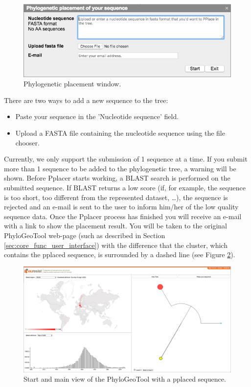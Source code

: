 \documentclass[a4paper, 11pt]{article} %
\begin{document}
\begin{figure}[H]
\centering
\includegraphics[scale=0.50]{images/pplacerWindow.png}
\vspace{-0.25cm}
\caption{Phylogenetic placement window.}
\label{fig:pplacerwindow}
\end{figure}

\noindent There are two ways to add a new sequence to the tree:
\begin{itemize}
\item Paste your sequence in the 'Nucleotide sequence' field.
\item Upload a FASTA file containing the nucleotide sequence using the file chooser.
\end{itemize}
Currently, we only support the submission of 1 sequence at a time.
If you submit more than 1 sequence to be added to the phylogenetic tree, a warning will be shown.
Before Pplacer starts working, a BLAST search is performed on the submitted sequence. 
If BLAST returns a low score (if, for example, the sequence is too short, too different from the represented dataset, \ldots), the sequence is rejected and an e-mail is sent to the user to inform him/her of the low quality sequence data.
Once the Pplacer process has finished you will receive an e-mail with a link to show the placement result.
You will be taken to the original PhyloGeoTool web-page (such as described in Section \ref{sec:core_func_user_interface}) with the difference that the cluster, which contains the pplaced sequence, is surrounded by a dashed line (see Figure \ref{fig:pplacer-view}). 

\begin{figure}[H]
\centering
\includegraphics[scale=0.1875]{images/pplaced_sequence.png}
\vspace{-0.75cm}
\caption{Start and main view of the PhyloGeoTool with a pplaced sequence.}
\label{fig:pplacer-view}
\end{figure}
\end{document}
